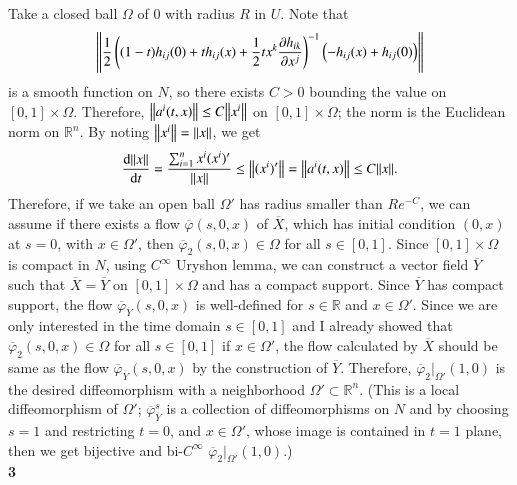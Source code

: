 \documentclass[a4paper, 12pt]{article}
\theoremstyle{Mydefinition}
\theoremstyle{Mytheorem}
\begin{document}
Take a closed ball $\Omega$ of $0$ with radius $R$ in $U$. Note that 
\begin{equation*}
    \norm{\frac{1}{2}\left((1-t)h_{ij}(0) + th_{ij}(x) + \frac{1}{2}tx^k\pdv{h_{ik}}{x^j}\right)^{-1}
    \left(-h_{ij}(x)+h_{ij}(0)\right)}
\end{equation*}
is a smooth function on $N$, so there exists $C>0$ bounding the value on $[0,1]\times \Omega$. Therefore, $\norm{a^i(t,x)} \leq C\norm{x^i}$ on $[0,1]\times \Omega$; the norm is the Euclidean norm on $\mathbb{R}^n$. By noting $\norm{x^i} = \norm{x}$, we get
\begin{equation*}
    \dv{\norm{x}}{t} = \frac{\sum_{i=1}^n x^i (x^i)'}{\norm{x}}\leq \norm{(x^i)'} = \norm{a^i(t,x)}\leq C\norm{x}.
\end{equation*}
Therefore, if we take an open ball $\Omega'$ has radius smaller than $Re^{-C}$, we can assume if there exists a flow $\overline{\varphi}(s,0,x)$ of $\overline{X}$, which has initial condition $(0,x)$ at $s=0$, with $x\in \Omega'$, then $\overline{\varphi}_2(s,0,x)\in \Omega$ for all $s\in [0,1]$. Since $[0,1]\times \Omega$ is compact in $N$, using $C^\infty$ Uryshon lemma, we can construct a vector field $\overline{Y}$ such that $\overline{X}=\overline{Y}$ on $[0,1]\times \Omega$ and has a compact support. Since $\overline{Y}$ has compact support, the flow $\overline{\varphi}_{\overline{Y}}(s,0,x)$ is well-defined for $s\in \mathbb{R}$ and $x\in \Omega'$. Since we are only interested in the time domain $s\in [0,1]$ and I already showed that $\overline{\varphi}_2(s,0,x) \in \Omega$ for all $s\in [0,1]$ if $x\in \Omega'$, the flow calculated by $\overline{X}$ should be same as the flow $\overline{\varphi}_{\overline{Y}}(s,0,x)$ by the construction of $\overline{Y}$. Therefore, $\overline{\varphi}_2|_{\Omega'}(1,0)$ is the desired diffeomorphism with a neighborhood $\Omega'\subset \mathbb{R}^n$. (This is a local diffeomorphism of $\Omega'$; $\overline{\varphi}_{\overline{Y}}^s$ is a collection of diffeomorphisms on $N$ and by choosing $s=1$ and restricting $t=0$, and $x\in \Omega'$, whose image is contained in $t=1$ plane, then we get bijective and bi-$C^\infty$ $\overline{\varphi}_2|_{\Omega'}(1,0)$.)\\

\noindent \textbf{3}
\end{document}
